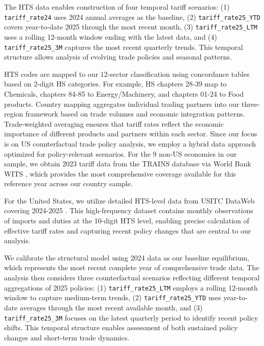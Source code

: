 The HTS data enables construction of four temporal tariff scenarios: (1) \texttt{tariff\_rate24} uses 2024 annual averages as the baseline, (2) \texttt{tariff\_rate25\_YTD} covers year-to-date 2025 through the most recent month, (3) \texttt{tariff\_rate25\_LTM} uses a rolling 12-month window ending with the latest data, and (4) \texttt{tariff\_rate25\_3M} captures the most recent quarterly trends. This temporal structure allows analysis of evolving trade policies and seasonal patterns.

HTS codes are mapped to our 12-sector classification using concordance tables based on 2-digit HS categories. For example, HS chapters 28-39 map to Chemicals, chapters 84-85 to Energy/Machinery, and chapters 01-24 to Food products. Country mapping aggregates individual trading partners into our three-region framework based on trade volumes and economic integration patterns. Trade-weighted averaging ensures that tariff rates reflect the economic importance of different products and partners within each sector.
Since our focus is on US counterfactual trade policy analysis, we employ a hybrid data approach optimized for policy-relevant scenarios. For the 9 non-US economies in our sample, we obtain 2023 tariff data from the TRAINS database via World Bank WITS \citep{WorldBank_WITS}, which provides the most comprehensive coverage available for this reference year across our country sample.

For the United States, we utilize detailed HTS-level data from USITC DataWeb covering 2024-2025 \citep{USITC_DataWeb_HTS}. This high-frequency dataset contains monthly observations of imports and duties at the 10-digit HTS level, enabling precise calculation of effective tariff rates and capturing recent policy changes that are central to our analysis.

We calibrate the structural model using 2024 data as our baseline equilibrium, which represents the most recent complete year of comprehensive trade data. The analysis then considers three counterfactual scenarios reflecting different temporal aggregations of 2025 policies: (1) \texttt{tariff\_rate25\_LTM} employs a rolling 12-month window to capture medium-term trends, (2) \texttt{tariff\_rate25\_YTD} uses year-to-date averages through the most recent available month, and (3) \texttt{tariff\_rate25\_3M} focuses on the latest quarterly period to identify recent policy shifts. This temporal structure enables assessment of both sustained policy changes and short-term trade dynamics.